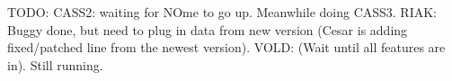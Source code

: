 \begin{figure}[t]
\vminfive

\vminfive
\end{figure}




TODO: CASS2: waiting for NOme to go up.
Meanwhile doing CASS3. 
%
RIAK: Buggy done, but need to plug in data from new version
(Cesar is adding fixed/patched line from the newest version).
%
VOLD: (Wait until all features are in).  Still running.
\fi
